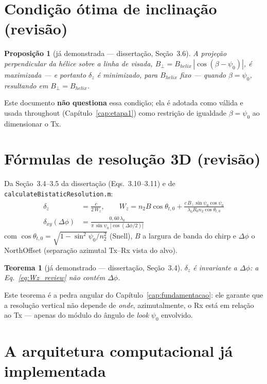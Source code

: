 \documentclass[12pt,a4paper,oneside]{book}
\newtheorem{teorema}{Teorema}[chapter]
\newtheorem{proposicao}{Proposição}[chapter]
\theoremstyle{definition}
\theoremstyle{remark}
\newcommand{\ndos}{n_2}
\newcommand{\dxy}{\delta_{xy}}
\newcommand{\dz}{\delta_z}
\begin{document}
\section{Condição ótima de inclinação (revisão)}
\label{sec:helix_review}

\begin{proposicao}[já demonstrada — dissertação, Seção~3.6]
A projeção perpendicular da hélice sobre a linha de visada,
$B_\perp = B_{helix}\,|\cos(\beta-\psi_0)|$, é maximizada — e portanto $\dz$
é minimizado, para $B_{helix}$ fixo — quando $\beta=\psi_0$, resultando em
$B_\perp=B_{helix}$.
\end{proposicao}

Este documento \textbf{não questiona} essa condição; ela é adotada como
válida e usada throughout (Capítulo~\ref{cap:etapa1}) como restrição de
igualdade $\beta=\psi_0$ ao dimensionar o Tx.

\section{Fórmulas de resolução 3D (revisão)}
\label{sec:resolucao_review}

Da Seção~3.4--3.5 da dissertação (Eqs.~3.10--3.11) e de
\texttt{calculateBistaticResolution.m}:
\begin{align}
  \dz &= \frac{c}{2\,W_z}, \qquad
  W_z = \ndos B\cos\theta_{t,0}
  + \frac{c\,B_\perp\sin\psi_0\cos\psi_0}{\lambda_0 R_0 \ndos\cos\theta_{t,0}}
  \label{eq:Wz_review}\\
  \dxy(\Delta\phi) &= \frac{0{,}60\,\lambda_0}{\pi\,\sin\psi_0\,|\cos(\Delta\phi/2)|}
  \label{eq:dxy_review}
\end{align}
com $\cos\theta_{t,0}=\sqrt{1-\sin^2\psi_0/\ndos^2}$ (Snell), $B$ a largura
de banda do chirp e $\Delta\phi$ o NorthOffset (separação azimutal Tx--Rx
vista do alvo).

\begin{teorema}[já demonstrado — dissertação, Seção~3.4]
\label{teo:invariancia_review}
$\dz$ é invariante a $\Delta\phi$: a Eq.~\eqref{eq:Wz_review} não contém
$\Delta\phi$.
\end{teorema}

Este teorema é a pedra angular do Capítulo~\ref{cap:fundamentacao}: ele
garante que a resolução vertical não depende de \emph{onde}, azimutalmente,
o Rx está em relação ao Tx — apenas do módulo do ângulo de \textit{look}
$\psi_0$ envolvido.

\section{A arquitetura computacional já implementada}
\label{sec:arquitetura_review}
\end{document}

